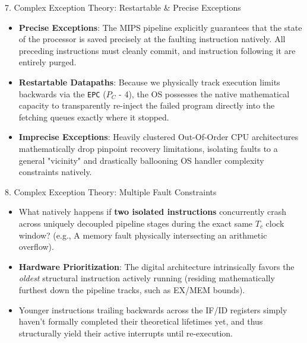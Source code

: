 \documentclass[aspectratio=169]{beamer}
\begin{document}
\begin{frame}{7. Complex Exception Theory: Restartable & Precise Exceptions}
\begin{itemize}
    \item \textbf{Precise Exceptions}: The MIPS pipeline explicitly guarantees that the state of the processor is saved precisely at the faulting instruction natively. All preceding instructions must cleanly commit, and instruction following it are entirely purged.
    \item \textbf{Restartable Datapaths}: Because we physically track execution limits backwards via the \texttt{EPC} ($P_C$ - 4), the OS possesses the native mathematical capacity to transparently re-inject the failed program directly into the fetching queues exactly where it stopped.
    \item \textbf{Imprecise Exceptions}: Heavily clustered Out-Of-Order CPU architectures mathematically drop pinpoint recovery limitations, isolating faults to a general "vicinity" and drastically ballooning OS handler complexity constraints natively.
\end{itemize}
\end{frame}

\begin{frame}{8. Complex Exception Theory: Multiple Fault Constraints}
\begin{itemize}
    \item What natively happens if \textbf{two isolated instructions} concurrently crash across uniquely decoupled pipeline stages during the exact same $T_c$ clock window? (e.g., A memory fault physically intersecting an arithmetic overflow).
    \item \textbf{Hardware Prioritization}: The digital architecture intrinsically favors the \textit{oldest} structural instruction actively running (residing mathematically furthest down the pipeline tracks, such as EX/MEM bounds).
    \item Younger instructions trailing backwards across the IF/ID registers simply haven't formally completed their theoretical lifetimes yet, and thus structurally yield their active interrupts until re-execution.
\end{itemize}
\end{frame}
\end{document}
